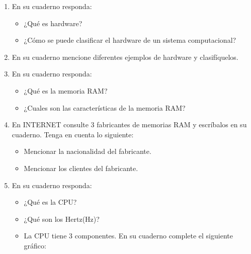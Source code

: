\documentclass[letterpaper,10pt,spanish]{sphinxmanual}
\begin{document}
\begin{enumerate}
%
\setcounter{enumi}{5}
\item {} 
\sphinxAtStartPar
En su cuaderno responda:
\begin{itemize}
\item {} 
\sphinxAtStartPar
¿Qué es hardware?

\item {} 
\sphinxAtStartPar
¿Cómo se puede clasificar el hardware de un sistema computacional?

\end{itemize}

\item {} 
\sphinxAtStartPar
En su cuaderno mencione diferentes ejemplos de hardware y clasifíquelos.

\item {} 
\sphinxAtStartPar
En su cuaderno responda:
\begin{itemize}
\item {} 
\sphinxAtStartPar
¿Qué es la memoria RAM?

\item {} 
\sphinxAtStartPar
¿Cuales son las características de la memoria RAM?

\end{itemize}

\item {} 
\sphinxAtStartPar
En INTERNET consulte 3 fabricantes de memorias RAM y escríbalos en su cuaderno. Tenga en cuenta lo siguiente:
\begin{itemize}
\item {} 
\sphinxAtStartPar
Mencionar la nacionalidad del fabricante.

\item {} 
\sphinxAtStartPar
Mencionar los clientes del fabricante.

\end{itemize}

\item {} 
\sphinxAtStartPar
En su cuaderno responda:
\begin{itemize}
\item {} 
\sphinxAtStartPar
¿Qué es la CPU?

\item {} 
\sphinxAtStartPar
¿Qué son los Hertz(Hz)?

\item {} 
\sphinxAtStartPar
La CPU tiene 3 componentes. En su cuaderno complete el siguiente gráfico:



\end{itemize}
\end{enumerate}
\end{document}
